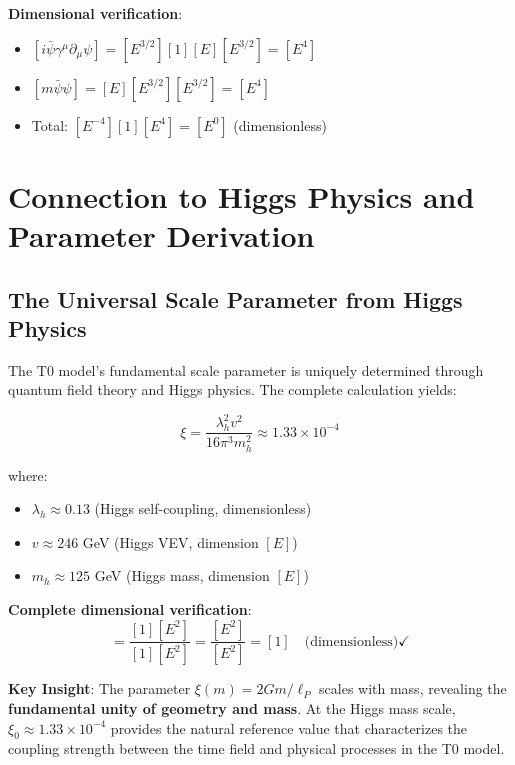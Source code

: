 	\textbf{Dimensional verification}:
	\begin{itemize}
		\item $[i\bar{\psi}\gamma^\mu\partial_\mu\psi] = [E^{3/2}][1][E][E^{3/2}] = [E^4]$
		\item $[m\bar{\psi}\psi] = [E][E^{3/2}][E^{3/2}] = [E^4]$
		\item Total: $[E^{-4}][1][E^4] = [E^0]$ (dimensionless) \checkmark
	\end{itemize}
	
	\section{Connection to Higgs Physics and Parameter Derivation}
	\label{sec:higgs_parameter_connection}
	
	\subsection{The Universal Scale Parameter from Higgs Physics}
	\label{subsec:universal_scale_parameter}
	
	The T0 model's fundamental scale parameter is uniquely determined through quantum field theory and Higgs physics. The complete calculation yields:
	
	\begin{equation}
		\boxed{\xi = \frac{\lambda_h^2 v^2}{16\pi^3 m_h^2} \approx 1.33 \times 10^{-4}}
		\label{eq:xi_higgs_universal}
	\end{equation}
	
	where:
	\begin{itemize}
		\item $\lambda_h \approx 0.13$ (Higgs self-coupling, dimensionless)
		\item $v \approx 246$ GeV (Higgs VEV, dimension $[E]$)
		\item $m_h \approx 125$ GeV (Higgs mass, dimension $[E]$)
	\end{itemize}
	
	\textbf{Complete dimensional verification}:
	\begin{equation}
		[\xi] = \frac{[1][E^2]}{[1][E^2]} = \frac{[E^2]}{[E^2]} = [1] \quad \text{(dimensionless)} \checkmark
	\end{equation}
	
\begin{tcolorbox}[colback=green!5!white,colframe=green!75!black,title=Universal Scale Parameter]
	\textbf{Key Insight}: The parameter $\xi(m) = 2Gm/\ell_P$ scales with mass, revealing the \textbf{fundamental unity of geometry and mass}. At the Higgs mass scale, $\xi_0 \approx 1.33 \times 10^{-4}$ provides the natural reference value that characterizes the coupling strength between the time field and physical processes in the T0 model.
\end{tcolorbox}
	
